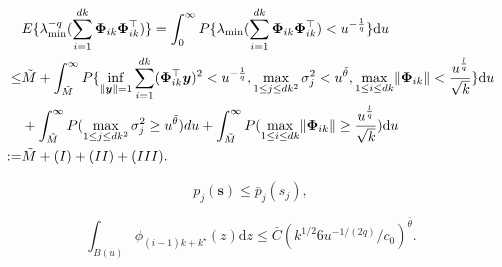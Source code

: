 \documentclass[10pt,a4paper]{amsart}
\begin{document}
\begin{equation}\label{pt.fisher.3}
\begin{split}
     & E\{\lambda_{\min}^{-q}(\sum_{i=1}^{dk}\bm{\Phi}_{ik}\bm{\Phi}_{ik}^\top)\} =   \int_{0}^{\infty}P\{\lambda_{\min}(\sum_{i=1}^{dk}\bm{\Phi}_{ik}\bm{\Phi}_{ik}^\top)<u^{-\frac{1}{q}}\}\mathrm{d}u \\
    \leq & \tilde{M}+\int_{\tilde{M}}^{\infty}P\{\inf\limits_{\lVert \bm{y}\rVert=1}\sum_{i=1}^{dk}(\bm{\Phi}_{ik}^\top\bm{y})^2<u^{-\frac{1}{q}},
   \max\limits_{1\leq j\leq dk^2}\sigma_j^2<u^{\tilde{\theta}},\max\limits_{1\leq i\leq dk}\lVert\bm{\Phi}_{ik}\rVert<\frac{u^{\frac{l}{q}}}{\sqrt{k}}\}\mathrm{d}u \\
     & +\int_{\tilde{M}}^{\infty}P(\max\limits_{1\leq j\leq dk^2}\sigma_j^2\geq u^{\tilde{\theta}})du+\int_{\tilde{M}}^{\infty}P({\max\limits_{1\leq i\leq dk}\lVert\bm{\Phi}_{ik}\rVert\geq \frac{u^{\frac{l}{q}}}{\sqrt{k}}})\mathrm{d}u \\
    := & \tilde{M}+{\rm (I)+(II)+(III)}.
\end{split}
\end{equation}

\begin{equation}\label{p j less bar p j}
p_j(\mathbf{s})\leq\bar{p}_j(s_j),
\end{equation}

\begin{equation}\label{ing113}
\int_{B(u)}\phi_{(i-1)k+k^{\star}}(z)\mathrm{d}z\leq \bar{C}(k^{1/2}6u^{-1/(2q)}/c_0)^{\bar{\theta}}.
\end{equation}
\end{document}
